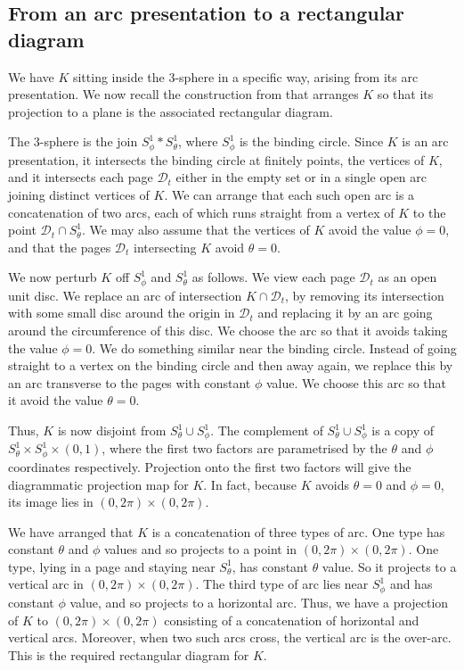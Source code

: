 \documentclass[oneside]{amsart}
\numberwithin{equation}{section}
\theoremstyle{plain}
\theoremstyle{definition}
\begin{document}
\subsection{From an arc presentation to a rectangular diagram}

We have $K$ sitting inside the 3-sphere in a specific way, arising from its arc presentation. We now recall
the construction from \cite{Cromwell} that arranges $K$ so that its projection to a plane is the
associated rectangular diagram.

The 3-sphere is the join $S^1_\phi \ast S^1_\theta$, where $S^1_\phi$ is the binding circle.
Since $K$ is an arc presentation, it intersects the binding circle at finitely points, the vertices of $K$, and it intersects each
page $\mathcal{D}_t$ either in the empty set or in a single open arc joining distinct vertices of $K$.
We can arrange that each such open arc is a concatenation of two arcs, each of which runs straight
from a vertex of $K$ to the point $\mathcal{D}_t \cap S^1_\theta$.
We may also assume that the vertices of $K$ avoid the value $\phi = 0$, and that the
pages $\mathcal{D}_t$ intersecting $K$ avoid $\theta = 0$.

We now perturb $K$ off $S^1_\phi$ and $S^1_\theta$ as follows. We view each page $\mathcal{D}_t$ as 
an open unit disc. We replace an arc of intersection $K \cap \mathcal{D}_t$, by removing its intersection
with some small disc around the origin in $\mathcal{D}_t$ and replacing it by an arc going
around the circumference of this disc. We choose the arc so that it avoids taking the value $\phi = 0$.
We do something similar near the binding circle. Instead of going straight to a vertex on the binding
circle and then away again, we replace this by an arc transverse to the pages with constant $\phi$ value.
We choose this arc so that it avoid the value $\theta = 0$.

Thus, $K$ is now disjoint from $S^1_\theta \cup S^1_\phi$.
The complement of $S^1_\theta \cup S^1_\phi$ is a copy of $S^1_\theta \times S^1_\phi \times (0,1)$,
where the first two factors are parametrised by the $\theta$ and $\phi$ coordinates respectively.
Projection onto the first two factors will give the diagrammatic projection map for $K$.
In fact, because $K$ avoids $\theta = 0$ and $\phi = 0$, its image lies in $(0,2 \pi) \times (0,2 \pi)$.

We have arranged that $K$ is a concatenation of three types of arc. One type has constant $\theta$
and $\phi$ values and so projects to a point in $(0,2\pi) \times (0,2\pi)$. One type, lying in a page
and staying near $S^1_\theta$, has constant $\theta$ value. So it projects to a vertical arc
in $(0,2\pi) \times (0,2\pi)$. The third type of arc lies near $S^1_\phi$ and has constant $\phi$ value,
and so projects to a horizontal arc. Thus, we have a projection of $K$ to $(0,2\pi) \times (0,2\pi)$
consisting of a concatenation of horizontal and vertical arcs. Moreover, when two such arcs cross,
the vertical arc is the over-arc. This is the required rectangular diagram for $K$.
\end{document}
